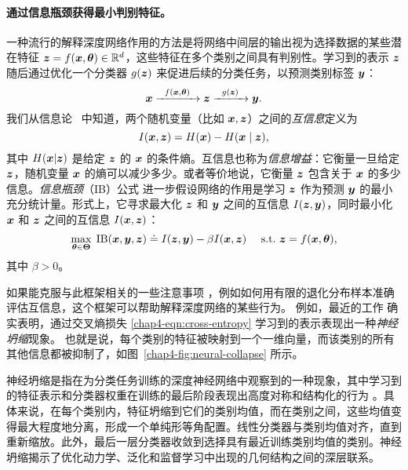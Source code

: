 \documentclass[../../book-main_zh.tex]{subfiles}
\begin{document}
\paragraph{通过信息瓶颈获得最小判别特征。}
一种流行的解释深度网络作用的方法是将网络中间层的输出视为选择数据的某些潜在特征 $\bm{z} = f(\bm{x}, \bm \theta) \in \mathbb{R}^d$，这些特征在多个类别之间具有判别性。学习到的表示 $\bm{z}$ 随后通过优化一个分类器 $g(\bm{z})$ 来促进后续的分类任务，以预测类别标签 $\bm{y}$：
\begin{equation}
	\bm{x}   \xrightarrow{\hspace{2mm} f(\bm{x}, \bm \theta)\hspace{2mm}} \bm{z}  \xrightarrow{\hspace{2mm} g(\bm{z}) \hspace{2mm}} \bm{y}.
\end{equation}
我们从信息论~\cite{Cover-Thomas} 中知道，两个随机变量（比如 $\bm{x},\bm{z}$）之间的{\em 互信息}定义为
\begin{equation}
	I(\bm{x}, \bm{z}) = H(\bm{x}) - H(\bm{x}\mid \bm{z}),
\end{equation}
其中 $H(\bm{x} \vert \bm{z})$ 是给定 $\bm{z}$ 的 $\bm{x}$ 的条件熵。互信息也称为{\em 信息增益}：它衡量一旦给定 $\bm{z}$，随机变量 $\bm{x}$ 的熵可以减少多少。或者等价地说，它衡量 $\bm{z}$ 包含关于 $\bm{x}$ 的多少信息。{\em 信息瓶颈}（IB）公式 \cite{Tishby-ITW2015} 进一步假设网络的作用是学习 $\bm{z}$ 作为预测 $\bm{y}$ 的最小充分统计量。形式上，它寻求最大化 $\bm{z}$ 和 $\bm{y}$ 之间的互信息 $I(\bm{z}, \bm{y})$，同时最小化 $\bm{x}$ 和 $\bm{z}$ 之间的互信息 $I(\bm{x}, \bm{z})$：
\begin{equation}
	\max_{\bm \theta\in \bm \Theta}\; \mbox{IB}(\bm{x}, \bm{y}, \bm{z}) \doteq I(\bm{z}, \bm{y}) - \beta I(\bm{x}, \bm{z}) \quad\ \mathrm{s.t.}\ \bm{z} = f(\bm{x}, \bm \theta),
	\label{chap4-eqn:information-bottleneck}
\end{equation}
其中 $\beta >0$。

如果能克服与此框架相关的一些注意事项 \cite{kolchinsky2018caveats-ICLR2018}，例如如何用有限的退化分布样本准确评估互信息，这个框架可以帮助解释深度网络的某些行为。
例如，最近的工作 \cite{papyan2020prevalence} 确实表明，通过交叉熵损失 \eqref{chap4-eqn:cross-entropy} 学习到的表示表现出一种\emph{神经坍缩}现象。
也就是说，每个类别的特征被映射到一个一维向量，而该类别的所有其他信息都被抑制了，如图~\ref{chap4-fig:neural-collapse} 所示。
\begin{remark}
    神经坍缩是指在为分类任务训练的深度神经网络中观察到的一种现象，其中学习到的特征表示和分类器权重在训练的最后阶段表现出高度对称和结构化的行为 \cite{papyan2020prevalence,zhu2021geometric}。具体来说，在每个类别内，特征坍缩到它们的类别均值，而在类别之间，这些均值变得最大程度地分离，形成一个单纯形等角配置。线性分类器与类别均值对齐，直到重新缩放。此外，最后一层分类器收敛到选择具有最近训练类别均值的类别。神经坍缩揭示了优化动力学、泛化和监督学习中出现的几何结构之间的深层联系。
\end{remark}
\end{document}
